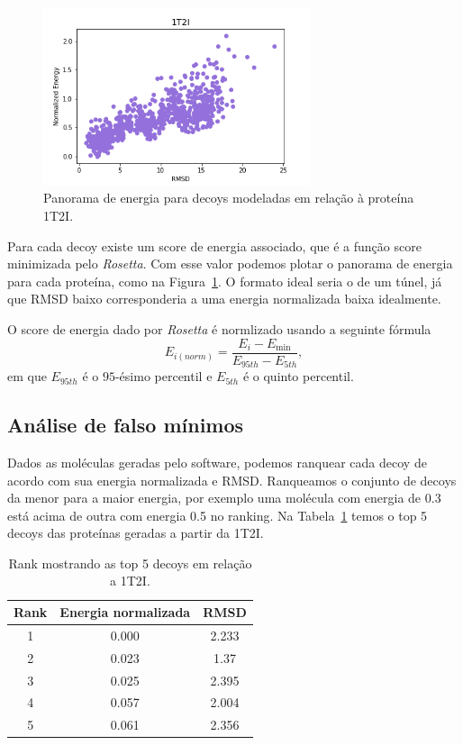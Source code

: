 \begin{figure}[!htbp]
    \centering
    \includegraphics[width=0.7\textwidth]{images/relatorio/1t2i_tunnel.png}
    \caption{Panorama de energia para decoys modeladas em relação à proteína 1T2I.}
    \label{fig:1t2iland}
    \fautor
\end{figure}

Para cada decoy existe um score de energia associado, que é a função score minimizada pelo \textit{Rosetta}.
Com esse valor podemos plotar o panorama de energia para cada proteína, como na Figura~\ref{fig:1t2iland}.
O formato ideal seria o de um túnel, já que RMSD baixo corresponderia a uma energia normalizada baixa idealmente.

O score de energia dado por \textit{Rosetta} é normlizado usando a seguinte fórmula
\begin{equation}
    E_{i(norm)} = \frac{E_i - E_{\min}}{E_{95th} - E_{5th}},
\end{equation}
em que $E_{95th}$ é o $95$-ésimo percentil e $E_{5th}$ é o quinto percentil.

\subsection{Análise de falso mínimos}
Dados as moléculas geradas pelo software, podemos ranquear cada decoy de acordo com sua energia normalizada
e RMSD. Ranqueamos o conjunto de decoys da menor para a maior energia, por exemplo uma molécula com energia
de 0.3 está acima de outra com energia 0.5 no ranking. Na Tabela~\ref{tab:protrank} temos o top 5 decoys
das proteínas geradas a partir da 1T2I.

\begin{table}[!htbp]
    \centering
    \caption{Rank mostrando as top 5 decoys em relação a 1T2I.}
    \label{tab:protrank}
    \begin{tabular}{@{}ccc@{}}
        \toprule
        Rank & Energia normalizada & RMSD  \\
        \midrule
        1    & 0.000             & 2.233 \\
        2    & 0.023             & 1.37  \\
        3    & 0.025             & 2.395 \\
        4    & 0.057             & 2.004 \\
        5    & 0.061             & 2.356 \\
        \bottomrule
    \end{tabular}
\end{table}

